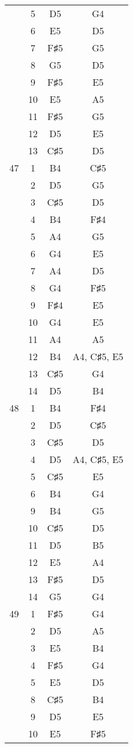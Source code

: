 \documentclass{article}
\begin{document}
\begin{longtable}{|c|c|c|c|}
  & 5 & D5 & G4 \\ 
  & 6 & E5 & D5 \\ 
  & 7 & F♯5 & G5 \\ 
  & 8 & G5 & D5 \\ 
  & 9 & F♯5 & E5 \\ 
  & 10 & E5 & A5 \\ 
  & 11 & F♯5 & G5 \\ 
  & 12 & D5 & E5 \\ 
  & 13 & C♯5 & D5 \\ 
\hline
47 & 1 & B4 & C♯5 \\ 
  & 2 & D5 & G5 \\ 
  & 3 & C♯5 & D5 \\ 
  & 4 & B4 & F♯4 \\ 
  & 5 & A4 & G5 \\ 
  & 6 & G4 & E5 \\ 
  & 7 & A4 & D5 \\ 
  & 8 & G4 & F♯5 \\ 
  & 9 & F♯4 & E5 \\ 
  & 10 & G4 & E5 \\ 
  & 11 & A4 & A5 \\ 
  & 12 & B4 & A4, C♯5, E5 \\ 
  & 13 & C♯5 & G4 \\ 
  & 14 & D5 & B4 \\ 
\hline
48 & 1 & B4 & F♯4 \\ 
  & 2 & D5 & C♯5 \\ 
  & 3 & C♯5 & D5 \\ 
  & 4 & D5 & A4, C♯5, E5 \\ 
  & 5 & C♯5 & E5 \\ 
  & 6 & B4 & G4 \\ 
  & 9 & B4 & G5 \\ 
  & 10 & C♯5 & D5 \\ 
  & 11 & D5 & B5 \\ 
  & 12 & E5 & A4 \\ 
  & 13 & F♯5 & D5 \\ 
  & 14 & G5 & G4 \\ 
\hline
49 & 1 & F♯5 & G4 \\ 
  & 2 & D5 & A5 \\ 
  & 3 & E5 & B4 \\ 
  & 4 & F♯5 & G4 \\ 
  & 5 & E5 & D5 \\ 
  & 8 & C♯5 & B4 \\ 
  & 9 & D5 & E5 \\ 
  & 10 & E5 & F♯5 \\ 

\end{longtable}
\end{document}
